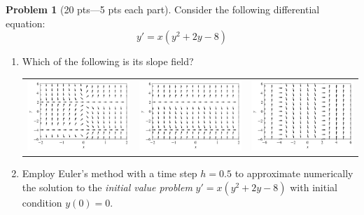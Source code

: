 \documentclass[12pt]{article}
\theoremstyle{definition}
\newtheorem{problem}{Problem}
\begin{document}
\bigskip
\begin{problem}[20 pts---5 pts each part]
Consider the following differential equation: 
\begin{equation*}
y' = x(y^2+2y-8)
\end{equation*}
\begin{enumerate}
  \item Which of the following is its slope field?
  \begin{flushleft}
  \begin{tabular}{ccc}
  \includegraphics[width=0.33\linewidth]{fquiver1.png} &
  \includegraphics[width=0.33\linewidth]{fquiver2.png} &
  \includegraphics[width=0.33\linewidth]{fquiver3.png}
  \end{tabular}
  \end{flushleft}
  \item Employ Euler's method with a time step $h=0.5$ to approximate numerically the solution to the \emph{initial value problem} $y'=x(y^2+2y-8)$ with initial condition $y(0)=0$.
  \begin{flushright}
\end{flushright}
\end{enumerate}
\end{problem}
\end{document}
